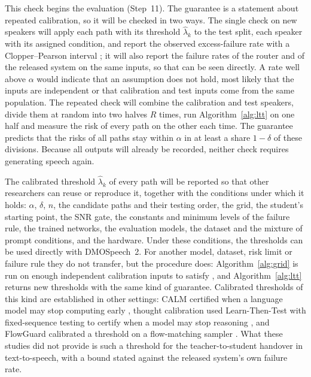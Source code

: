 This check begins the evaluation (Step~11). The guarantee is a statement about repeated calibration, so it will be checked in two ways. The single check on new speakers will apply each path with its threshold $\hat\lambda_k$ to the test split, each speaker with its assigned condition, and report the observed excess-failure rate with a Clopper--Pearson interval \parencite{clopper1934}; it will also report the failure rates of the router and of the released system on the same inputs, so that  can be seen directly. A rate well above $\alpha$ would indicate that an assumption does not hold, most likely that the inputs are independent or that calibration and test inputs come from the same population. The repeated check will combine the calibration and test speakers, divide them at random into two halves $R$ times, run Algorithm~\ref{alg:ltt} on one half and measure the risk of every path on the other each time. The guarantee predicts that the risks of all paths stay within $\alpha$ in at least a share $1-\delta$ of these divisions. Because all outputs will already be recorded, neither check requires generating speech again.

The calibrated threshold $\hat\lambda_k$ of every path will be reported so that other researchers can reuse or reproduce it, together with the conditions under which it holds: $\alpha$, $\delta$, $n$, the candidate paths and their testing order, the grid, the student's starting point, the SNR gate, the constants and minimum levels of the failure rule, the trained networks, the evaluation models, the dataset and the mixture of prompt conditions, and the hardware. Under these conditions, the thresholds can be used directly with DMOSpeech~2. For another model, dataset, risk limit or failure rule they do not transfer, but the procedure does: Algorithm~\ref{alg:grid} is run on enough independent calibration inputs to satisfy , and Algorithm~\ref{alg:ltt} returns new thresholds with the same kind of guarantee. Calibrated thresholds of this kind are established in other settings: CALM certified when a language model may stop computing early \parencite{schuster2022calm}, thought calibration used Learn-Then-Test with fixed-sequence testing to certify when a model may stop reasoning \parencite{wu2025thought}, and FlowGuard calibrated a threshold on a flow-matching sampler \parencite{li2025flowguard}. What these studies did not provide is such a threshold for the teacher-to-student handover in text-to-speech, with a bound stated against the released system's own failure rate.

